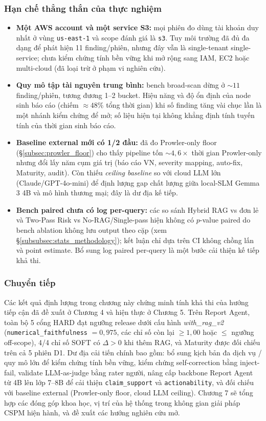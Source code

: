 \subsubsection*{Hạn chế thẳng thắn của thực nghiệm}
\begin{itemize}
  \item \textbf{Một AWS account và một service S3:} mọi phiên đo dùng tài khoản duy nhất ở vùng \texttt{us-east-1} và scope đánh giá là \texttt{s3}. Tuy môi trường đã đủ đa dạng để phát hiện 11 finding/phiên, nhưng đây vẫn là single-tenant single-service; chưa kiểm chứng tính bền vững khi mở rộng sang IAM, EC2 hoặc multi-cloud (đã loại trừ ở phạm vi nghiên cứu).
  \item \textbf{Quy mô tập tài nguyên trung bình:} bench broad-scan dừng ở $\sim 11$ finding/phiên, tương đương 1--2 bucket. Hiệu năng và độ ổn định của node sinh báo cáo (chiếm $\approx 48\%$ tổng thời gian) khi số finding tăng vài chục lần là một nhánh kiểm chứng để mở; số liệu hiện tại không khẳng định tính tuyến tính của thời gian sinh báo cáo.
  \item \textbf{Baseline external mới có 1/2 đầu:} đã đo Prowler-only floor (\S\ref{subsec:prowler_floor}) cho thấy pipeline tốn $\sim 4{,}6\times$ thời gian Prowler-only nhưng đổi lấy năm cụm giá trị (báo cáo VN, severity mapping, auto-fix, Maturity, audit). Còn thiếu \emph{ceiling baseline} so với cloud LLM lớn (Claude/GPT-4o-mini) để định lượng gap chất lượng giữa local-SLM Gemma 3 4B và mô hình thương mại; đây là dư địa kế tiếp.
  \item \textbf{Bench paired chưa có log per-query:} các so sánh Hybrid RAG vs đơn lẻ và Two-Pass Risk vs No-RAG/Single-pass hiện không có $p$-value paired do bench ablation không lưu output theo cặp (xem \S\ref{subsubsec:stats_methodology}); kết luận chỉ dựa trên CI không chồng lấn và point estimate. Bổ sung log paired per-query là một bước cải thiện kế tiếp khả thi.
\end{itemize}

\subsubsection*{Chuyển tiếp}
Các kết quả định lượng trong chương này chứng minh tính khả thi của hướng tiếp cận đã đề xuất ở Chương 4 và hiện thực ở Chương 5. Trên Report Agent, toàn bộ 5 cổng HARD đạt ngưỡng release dưới cấu hình \emph{with\_rag\_v2} (\texttt{numerical\_faithfulness} $= 0{,}975$, các chỉ số còn lại $\geq 1{,}00$ hoặc $\leq$ ngưỡng off-scope), 4/4 chỉ số SOFT có $\Delta > 0$ khi thêm RAG, và Maturity được đối chiếu trên cả 5 phiên D1. Dư địa cải tiến chính bao gồm: bổ sung kịch bản đa dịch vụ / quy mô lớn để kiểm chứng tính bền vững, kiểm chứng self-correction bằng inject-fail, validate LLM-as-judge bằng rater người, nâng cấp backbone Report Agent từ 4B lên lớp 7--8B để cải thiện \texttt{claim\_support} và \texttt{actionability}, và đối chiếu với baseline external (Prowler-only floor, cloud LLM ceiling). Chương 7 sẽ tổng hợp các đóng góp khoa học, vị trí của hệ thống trong không gian giải pháp CSPM hiện hành, và đề xuất các hướng nghiên cứu mở.

